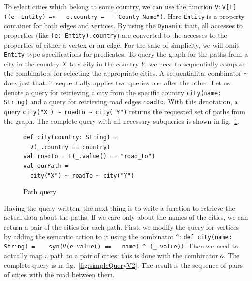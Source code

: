 To select cities which belong to some country, we can use the function \lstinline{V}: \lstinline{V[L]((e: Entity) =>   e.country =   "County Name")}.
Here \lstinline{Entity} is a property container for both edges and vertices. 
By using the \lstinline{Dynamic} trait, all accesses to properties (like \lstinline{(e: Entity).country}) are converted to the accesses to the properties of either a vertex or an edge.
For the sake of simplicity, we will omit \lstinline{Entity} type specifications for predicates. 
To query the graph for the paths from a city in the country $X$ to a city in the country $Y$, we need to sequentially compose the combinators for selecting the appropriate cities. 
A sequentialital combinator \lstinline{~} does just that: it sequentially  applies two queries one after the other. 
Let us denote a query for retrieving a city from the specific country \lstinline{city(name: String)} and a query for retrieving road edges \lstinline{roadTo}. 
With this denotation, a query \lstinline{city("X") ~ roadTo ~ city("Y")} returns the requested set of paths from the graph.
The complete query with all necessary subqueries is shown in fig.~\ref{fig:simpleQuery}.

\begin{figure}[h]
\begin{lstlisting}
def city(country: String) =
  V(_.country == country)
val roadTo = E(_.value() == "road_to")
val ourPath = 
  city("X") ~ roadTo ~ city("Y")
\end{lstlisting}
\caption{Path query}
\label{fig:simpleQuery}
\end{figure}

Having the query written, the next thing is to write a function to retrieve the actual data about the paths.
If we care only about the names of the cities, we can return a pair of the cities for each path.
First, we modify the query for vertices by adding the semantic action to it using the combinator \lstinline{^}: \lstinline{def city(name: String) =    syn(V(e.value() ==   name) ^ (_.value))}.
Then we need to actually map a path to a pair of cities: this is done with the combinator \lstinline{&}.
The complete query is in fig.~\ref{fig:simpleQueryV2}.
The result is the sequence of pairs of cities with the road between them.


